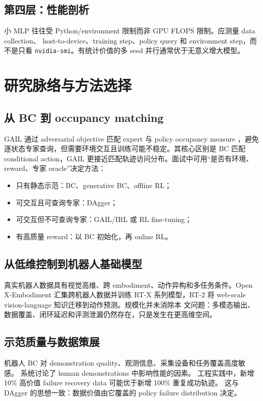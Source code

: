\documentclass[10pt,twocolumn,a4paper]{ctexart}
\begin{document}
\subsection{第四层：性能剖析}
小 MLP 往往受 Python/environment 限制而非 GPU FLOPS 限制。应测量 data collection、
host-to-device、training step、policy query 和 environment step，而不是只看
\texttt{nvidia-smi}。有统计价值的多 seed 并行通常优于无意义增大模型。

\section{研究脉络与方法选择}
\subsection{从 BC 到 occupancy matching}
GAIL 通过 adversarial objective 匹配 expert 与 policy occupancy measure
\citep{ho2016gail}，避免逐状态专家查询，但需要环境交互且训练可能不稳定。其核心区别是
BC 匹配 conditional action，GAIL 更接近匹配轨迹访问分布。面试中可用“是否有环境、
reward、专家 oracle”决定方法：
\begin{itemize}
  \item 只有静态示范：BC、generative BC、offline RL；
  \item 可交互且可查询专家：DAgger；
  \item 可交互但不可查询专家：GAIL/IRL 或 RL fine-tuning；
  \item 有高质量 reward：以 BC 初始化，再 online RL。
\end{itemize}

\subsection{从低维控制到机器人基础模型}
真实机器人数据具有视觉高维、跨 embodiment、动作异构和多任务条件。Open
X-Embodiment 汇集跨机器人数据并训练 RT-X 系列模型\citep{openx2024}，RT-2 将
web-scale vision-language 知识迁移到动作预测\citep{brohan2023rt2}。规模化并未消除本
文问题：多模态输出、数据覆盖、闭环延迟和评测泄漏仍然存在，只是发生在更高维空间。

\subsection{示范质量与数据策展}
机器人 BC 对 demonstration quality、观测信息、采集设备和任务覆盖高度敏感。
\citet{mandlekar2022matters} 系统讨论了 human demonstrations 中影响性能的因素。
工程实践中，新增 10\% 高价值 failure recovery data 可能优于新增 100\% 重复成功轨迹。
这与 DAgger 的思想一致：数据价值由它覆盖的 policy failure distribution 决定。
\end{document}
